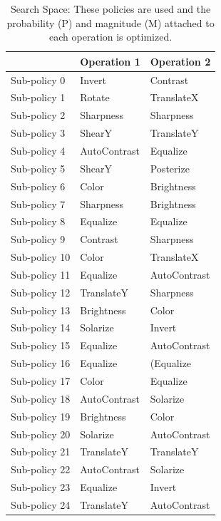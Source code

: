 \documentclass[10pt,twocolumn,letterpaper]{article}
\begin{document}
\begin{table}[h]
\begin{center}
\begin{tabular}{lll}
\hline
& Operation 1 & Operation 2 \\
\hline
Sub-policy 0 & Invert & Contrast \\
Sub-policy 1 & Rotate & TranslateX \\
Sub-policy 2 & Sharpness & Sharpness \\
Sub-policy 3 & ShearY & TranslateY \\
Sub-policy 4 & AutoContrast & Equalize \\
Sub-policy 5 & ShearY & Posterize \\
Sub-policy 6 & Color & Brightness \\
Sub-policy 7 & Sharpness & Brightness \\
Sub-policy 8 & Equalize & Equalize \\
Sub-policy 9 & Contrast & Sharpness \\
Sub-policy 10 & Color & TranslateX \\
Sub-policy 11 & Equalize & AutoContrast \\
Sub-policy 12 & TranslateY & Sharpness \\
Sub-policy 13 & Brightness & Color \\
Sub-policy 14 & Solarize & Invert \\
Sub-policy 15 & Equalize & AutoContrast \\
Sub-policy 16 & Equalize & (Equalize \\
Sub-policy 17 & Color & Equalize \\
Sub-policy 18 & AutoContrast & Solarize \\
Sub-policy 19 & Brightness & Color \\
Sub-policy 20 & Solarize & AutoContrast \\
Sub-policy 21 & TranslateY & TranslateY \\
Sub-policy 22 & AutoContrast & Solarize \\
Sub-policy 23 & Equalize & Invert \\
Sub-policy 24 & TranslateY & AutoContrast \\
\hline
\end{tabular}
\caption {Search Space: These policies are used and the probability (P) and magnitude (M) attached to each operation is optimized.} \label{tab:good_policies} 
\end{center}
\end{table}

{\small


}
\end{document}
